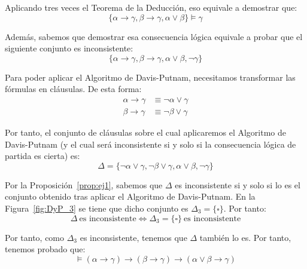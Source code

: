 \begin{ejemplo}
\begin{enumerate}
\begin{comment}
             Por el Teorema~\ref{teo:func_davis_putnam}, sabemos que $\Delta$ es inconsistente si y solo si lo es $\{\square\}$, que sí es inconsistente.
             \end{comment}

             Aplicando tres veces el Teorema de la Deducción, eso equivale a demostrar que:
            \begin{equation*}
                \{\alpha \rightarrow \gamma, \beta \rightarrow \gamma, \alpha \vee \beta\} \vDash \gamma
            \end{equation*}

            Además, sabemos que demostrar esa consecuencia lógica equivale a probar que el siguiente conjunto es inconsistente:
            \begin{equation*}
                \{\alpha \rightarrow \gamma, \beta \rightarrow \gamma, \alpha \vee \beta, \neg \gamma\}
            \end{equation*}

            Para poder aplicar el Algoritmo de Davis-Putnam, necesitamos transformar las fórmulas en cláusulas. De esta forma:
            \begin{align*}
                \alpha \rightarrow \gamma &\equiv \neg \alpha \vee \gamma\\
                \beta \rightarrow \gamma &\equiv \neg \beta \vee \gamma
            \end{align*}

            Por tanto, el conjunto de cláusulas sobre el cual aplicaremos el Algoritmo de Davis-Putnam (y el cual será inconsistente si y solo si la consecuencia lógica de partida es cierta) es:
            \begin{equation*}
                \Delta = \{\neg \alpha \vee \gamma, \neg \beta \vee \gamma, \alpha \vee \beta, \neg \gamma\}
            \end{equation*}

            Por la Proposición~\ref{prop:ej1}, sabemos que $\Delta$ es inconsistente si y solo si lo es el conjunto obtenido tras aplicar el Algoritmo de Davis-Putnam.
            En la Figura~\ref{fig:DyP_3} se tiene que dicho conjunto es $\Delta_3=\{\square\}$. Por tanto:
            \begin{equation*}
                \Delta\ \text{es inconsistente} \iff \Delta_3=\{\square\}\ \text{es inconsistente}
            \end{equation*}

            Por tanto, como $\Delta_3$ es inconsistente, tenemos que $\Delta$ también lo es. Por tanto, tenemos probado que:
            \begin{equation*}
                \vDash \left(\alpha \rightarrow \gamma\right) \rightarrow \left(\beta \rightarrow \gamma\right) \rightarrow \left(\alpha \vee \beta \rightarrow \gamma\right)
            \end{equation*}


\end{enumerate}
\end{ejemplo}
